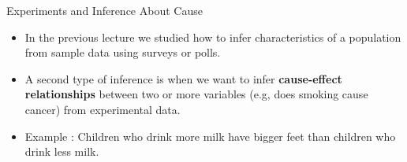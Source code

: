\documentclass[handout]{beamer}
\begin{document}
\begin{frame}{Experiments and Inference About Cause}
\scriptsize{
\begin{itemize}
 \item In the previous lecture we studied how to infer characteristics of a population from sample data using surveys or polls.
 \item A second type of inference is when we want to infer \textbf{cause-effect relationships} between two or more variables (e.g, does smoking cause cancer) from experimental data. 
 \item Example \cite{watkins2010statistics}: Children who drink more milk have bigger feet than children who drink less milk. 
 
 
\end{itemize}






} 
\end{frame}
\end{document}
